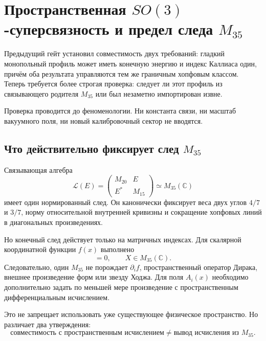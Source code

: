 \chapter{Пространственная \texorpdfstring{$SO(3)$}{SO(3)}-суперсвязность
и предел следа \texorpdfstring{$M_{35}$}{M35}}

Предыдущий гейт установил совместимость двух требований: гладкий
монопольный профиль может иметь конечную энергию и индекс Каллиаса один,
причём оба результата управляются тем же граничным хопфовым классом.
Теперь требуется более строгая проверка: следует ли этот профиль из
связывающего родителя $M_{35}$ или был незаметно импортирован извне.

Проверка проводится до феноменологии. Ни константа связи, ни масштаб
вакуумного поля, ни новый калибровочный сектор не вводятся.

\section{Что действительно фиксирует след
\texorpdfstring{$M_{35}$}{M35}}

Связывающая алгебра
\begin{equation}
 \mathcal L(E)=
 \begin{pmatrix}M_{20}&E\\E^*&M_{15}\end{pmatrix}
 \simeq M_{35}(\mathbb C)
\end{equation}
имеет один нормированный след. Он канонически фиксирует веса двух углов
$4/7$ и $3/7$, норму относительной внутренней кривизны и сокращение
хопфовых линий в диагональных произведениях.

Но конечный след действует только на матричных индексах. Для скалярной
координатной функции $f(x)$ выполнено
\begin{equation}
 [f(x)I_{35},X]=0,
 \qquad X\in M_{35}(\mathbb C).
 \label{eq:v5-spatial-trace-no-derivative}
\end{equation}
Следовательно, один $M_{35}$ не порождает $\partial_i f$, пространственный
оператор Дирака, внешнее произведение форм или звезду Ходжа. Для поля
$A_i(x)$ необходимо дополнительно задать по меньшей мере произведение с
пространственным дифференциальным исчислением.

Это не запрещает использовать уже существующее физическое пространство.
Но различает два утверждения:
\begin{equation}
 \text{совместимость с пространственным исчислением}
 \neq
 \text{вывод исчисления из }M_{35}.
\end{equation}


